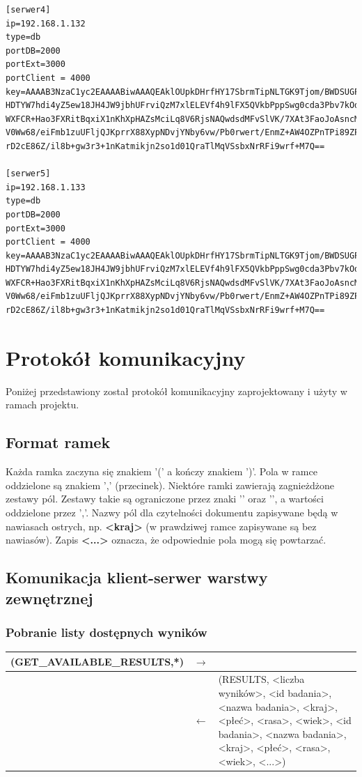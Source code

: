 \begin{lstlisting}[style=incode, caption=Plik konfiguracyjny serwera]
[serwer4]
ip=192.168.1.132
type=db
portDB=2000
portExt=3000
portClient = 4000
key=AAAAB3NzaC1yc2EAAAABiwAAAQEAklOUpkDHrfHY17SbrmTipNLTGK9Tjom/BWDSUGPl+nafzl
HDTYW7hdi4yZ5ew18JH4JW9jbhUFrviQzM7xlELEVf4h9lFX5QVkbPppSwg0cda3Pbv7kOdJ/MtyBl
WXFCR+Hao3FXRitBqxiX1nKhXpHAZsMciLq8V6RjsNAQwdsdMFvSlVK/7XAt3FaoJoAsncM1Q9x5+3
V0Ww68/eiFmb1zuUFljQJKprrX88XypNDvjYNby6vw/Pb0rwert/EnmZ+AW4OZPnTPi89ZPmVMLuay
rD2cE86Z/il8b+gw3r3+1nKatmikjn2so1d01QraTlMqVSsbxNrRFi9wrf+M7Q==

[serwer5]
ip=192.168.1.133
type=db
portDB=2000
portExt=3000
portClient = 4000
key=AAAAB3NzaC1yc2EAAAABiwAAAQEAklOUpkDHrfHY17SbrmTipNLTGK9Tjom/BWDSUGPl+nafzl
HDTYW7hdi4yZ5ew18JH4JW9jbhUFrviQzM7xlELEVf4h9lFX5QVkbPppSwg0cda3Pbv7kOdJ/MtyBl
WXFCR+Hao3FXRitBqxiX1nKhXpHAZsMciLq8V6RjsNAQwdsdMFvSlVK/7XAt3FaoJoAsncM1Q9x5+3
V0Ww68/eiFmb1zuUFljQJKprrX88XypNDvjYNby6vw/Pb0rwert/EnmZ+AW4OZPnTPi89ZPmVMLuay
rD2cE86Z/il8b+gw3r3+1nKatmikjn2so1d01QraTlMqVSsbxNrRFi9wrf+M7Q==
\end{lstlisting}

\section{Protokół komunikacyjny}
Poniżej przedstawiony został protokół komunikacyjny zaprojektowany i użyty w ramach projektu.

\subsection{Format ramek}
Każda ramka zaczyna się znakiem '(' a kończy znakiem ')'. Pola w ramce oddzielone są znakiem ',' (przecinek). Niektóre ramki zawierają zagnieżdżone zestawy pól. Zestawy takie są ograniczone przez znaki '{' oraz '}', a wartości oddzielone przez ','. Nazwy pól dla czytelności dokumentu zapisywane będą w nawiasach ostrych, np. \textbf{<kraj>} (w prawdziwej ramce zapisywane są bez nawiasów). Zapis \textbf{<...>} oznacza, że odpowiednie pola mogą się powtarzać.

\subsection{Komunikacja klient-serwer warstwy zewnętrznej}

\subsubsection{Pobranie listy dostępnych wyników}

\begin{longtable}{| p{} | p{}| p{} |} 
\hline
(GET\_AVAILABLE\_RESULTS,*) & $\rightarrow$ &  \\ \hline
 & $\leftarrow$ & (RESULTS, <liczba wyników>, <id badania>, <nazwa badania>, <kraj>, <płeć>, <rasa>, <wiek>, <id badania>, <nazwa badania>, <kraj>, <płeć>, <rasa>, <wiek>, <...>) \\ \hline
\end{longtable}

